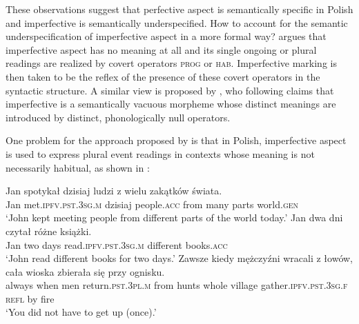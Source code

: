 \documentclass[output=paper]{langscibook}
\begin{document}
\noindent These observations suggest that perfective aspect is semantically specific in Polish and imperfective is semantically underspecified. How to account for the semantic underspecification of imperfective aspect in a more formal way? \citet{Hacquard2006} argues that imperfective aspect has no meaning at all and its single ongoing or plural readings are realized by covert operators \textsc{prog} or \textsc{hab}. Imperfective marking is then taken to be the reflex of the presence of these covert operators in the syntactic structure. A similar view is proposed by \citet{Frackowiak2015}, who following \citet{Hacquard2006} claims that imperfective is a semantically vacuous morpheme whose distinct meanings are introduced by distinct, phonologically null operators.

One problem for the approach proposed by \citet{Hacquard2006} is that in Polish, imperfective aspect is used to express plural event readings in contexts whose meaning is not necessarily habitual, as shown in :

\ea\label{jan-bla:fansb:kb:ex10}
\ea \gll Jan spotykał dzisiaj ludzi z wielu zakątków świata.\\  
       Jan met.\textsc{ipfv}.\textsc{pst}.\textsc{3sg}.\textsc{m} dzisiaj people.\textsc{acc} from many parts world.\textsc{gen}\\ 
\glt ‘John kept meeting people from different parts of the world today.’\label{jan-bla:fansb:kb:ex10a}
\ex \gll Jan dwa dni czytał różne książki. \\  
        Jan two days read.\textsc{ipfv}.\textsc{pst}.\textsc{3sg}.\textsc{m} different books.\textsc{acc}\\
\glt ‘John read different books for two days.’\label{jan-bla:fansb:kb:ex10b}
\ex \gll Zawsze kiedy mężczyźni wracali z łowów, cała wioska zbierała się przy ognisku.\\  
        always when men return.\textsc{pst}.\textsc{3pl}.\textsc{m} from hunts whole village gather.\textsc{ipfv.pst.3sg.f} \textsc{refl} by fire\\
\glt ‘You did not have to get up (once).’\label{jan-bla:fansb:kb:ex10c}
\z
\z
\end{document}
